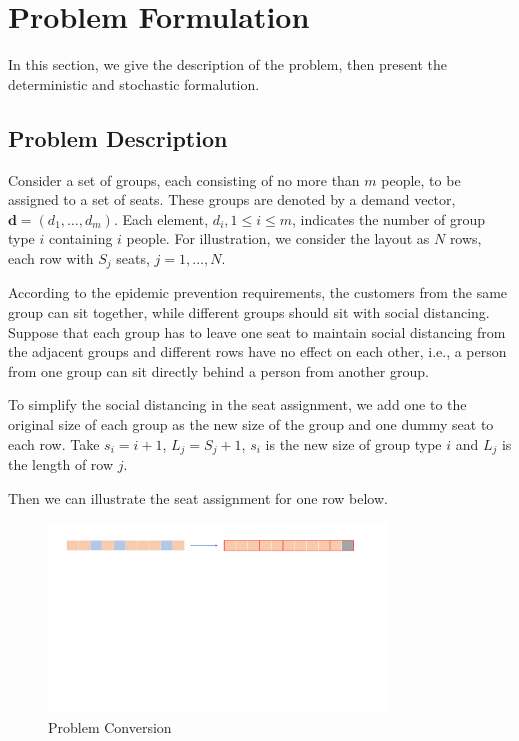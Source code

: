 \section{Problem Formulation}
In this section, we give the description of the problem, then present the deterministic and stochastic formalution.

\subsection{Problem Description}

Consider a set of groups, each consisting of no more than $m$ people, to be assigned to a set of seats. These groups are denoted by a demand vector, $\mathbf{d} = (d_1, \ldots, d_m)$. Each element, $d_i, 1 \leq i \leq m$, indicates the number of group type $i$ containing $i$ people. For illustration, we consider the layout as $N$ rows, each row with $S_{j}$ seats, $j = 1, \ldots, N$. 


According to the epidemic prevention requirements, the customers from the same group can sit together, while different groups should sit with social distancing. 
Suppose that each group has to leave one seat to maintain social distancing from the adjacent groups and different rows have no effect on each other, i.e., a person from one group can sit directly behind a person from another group.

To simplify the social distancing in the seat assignment, we add one to the original size of each group as the new size of the group and one dummy seat to each row. Take $s_{i} = i + 1$, $L_{j} = S_{j} +1$, $s_{i}$ is the new size of group type $i$ and $L_{j}$ is the length of row $j$.

Then we can illustrate the seat assignment for one row below. 

\begin{figure}[ht]
    \centering
    \includegraphics[width = 0.8\textwidth]{./Figures/dummy_seat.pdf}
    \caption{Problem Conversion}
\end{figure}

